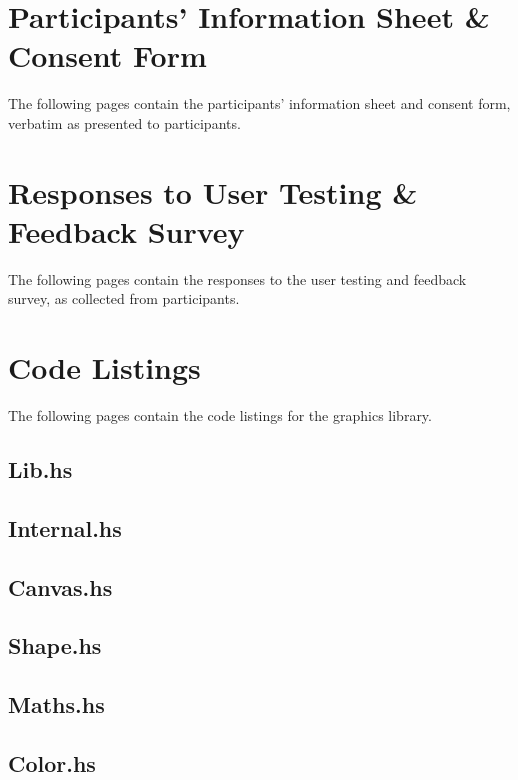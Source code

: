 \documentclass[../main.tex]{subfiles}
\begin{document}
\appendix
    \chapter{Participants' Information Sheet \& Consent Form} \label{app:consent}
        The following pages contain the participants' information sheet and consent
            form, verbatim as presented to participants.

        \begin{center}
            
        \end{center}

    \chapter{Responses to User Testing \& Feedback Survey} \label{app:feedback}
        The following pages contain the responses to the user testing and feedback
            survey, as collected from participants.

    \chapter{Code Listings} \label{app:code}
        The following pages contain the code listings for the graphics library.
        \section*{Lib.hs}
            
        \section*{Internal.hs}
            
        \section*{Canvas.hs}
            
        \section*{Shape.hs}
            
        \section*{Maths.hs}
            
        \section*{Color.hs}
            
\end{document}
